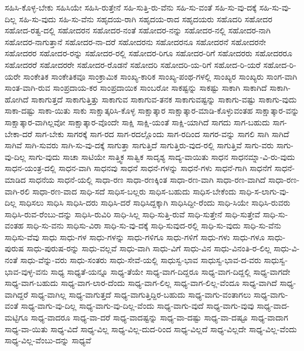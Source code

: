 {ಸಹಿಸಿ-ಕೊಳ್ಳ-ಬೇಕು
ಸಹಿಸಿಯೇ
ಸಹಿಸಿ-ರುತ್ತೇನೆ
ಸಹಿ-ಸುತ್ತಿ-ರು-ವೆನು
ಸಹಿ-ಸು-ವಂತೆ
ಸಹಿ-ಸು-ವು-ದಕ್ಕೆ
ಸಹಿ-ಸು-ವು-ದಿಲ್ಲ
ಸಹಿ-ಸು-ವುದು
ಸಹಿ-ಸು-ವೆನು
ಸಹೃದಯ-ರಾಗಿ
ಸಹೃದಯ-ರಾದ
ಸಹೃದಯರು
ಸಹೊದರಿ
ಸಹೋದರ
ಸಹೋದ-ರತ್ವ-ದಲ್ಲಿ
ಸಹೋದರನ
ಸಹೋದರ-ನಂತೆ
ಸಹೋದರ-ನನ್ನು
ಸಹೋದರ-ನಲ್ಲಿ
ಸಹೋದರ-ನಾಗಿ
ಸಹೋದರ-ನಾಗುತ್ತಾನೆ
ಸಹೋದರ-ನಾ-ದರೆ
ಸಹೋದರನು
ಸಹೋದರನೂ
ಸಹೋದರನೆ
ಸಹೋದರನೇ
ಸಹೋದರರ
ಸಹೋದರ-ರನ್ನು
ಸಹೋದರ-ರಲ್ಲಿ
ಸಹೋದರ-ರಿಗೂ
ಸಹೋದರ-ರಿಗೆ
ಸಹೋದರರು
ಸಹೋದರರೂ
ಸಹೋದರರೆ
ಸಹೋದರರೇ
ಸಹೋದರ-ರೊಡನೆ
ಸಹೋದರಿ
ಸಹೋದರಿ-ಯ-ರಿಗೆ
ಸಹೋದ-ರಿ-ಯರೆ
ಸಹೋದ-ರಿ-ಯರೇ
ಸಾಂಕೇತಿಕ
ಸಾಂಕೇತಿಕವೂ
ಸಾಂಕ್ರಾಮಿಕ
ಸಾಂಖ್ಯ-ಕಾರಿಕ
ಸಾಂಖ್ಯ-ಪಂಥ-ಗಳಲ್ಲಿ
ಸಾಂಖ್ಯರ
ಸಾಂಖ್ಯರು
ಸಾಂಗ-ವಾಗಿ
ಸಾಂತ-ವಾಗಿ-ರುವ
ಸಾಂಪ್ರದಾಯ-ಕರ
ಸಾಂಪ್ರದಾಯಿಕ
ಸಾಂಬರೋ
ಸಾಕಷ್ಟನ್ನು
ಸಾಕಷ್ಟು
ಸಾಕಾಗಿ
ಸಾಕಾಗಿದೆ
ಸಾಕಾಗಿ-ಹೋಗಿದೆ
ಸಾಕಾಗುತ್ತದೆ
ಸಾಕಾಗುತ್ತಿತ್ತು
ಸಾಕಾಗುವ
ಸಾಕಾಗುವ-ತನಕ
ಸಾಕಾಗುವಷ್ಟನ್ನು
ಸಾಕಾಗು-ವಷ್ಟು
ಸಾಕಾಗು-ವುದು
ಸಾಕಾ-ದಷ್ಟು
ಸಾಕಾ-ಯಿತು
ಸಾಕು
ಸಾಕ್ಷಾತ್ಕರಿಸಿ-ಕೊಳ್ಳ
ಸಾಕ್ಷಾತ್ಕಾರ
ಸಾಕ್ಷಾತ್ಕಾರ-ಮಾಡಿ-ಕೊಳ್ಳುವಂತಹ
ಸಾಕ್ಷಾತ್ಕಾರ-ವನ್ನು
ಸಾಕ್ಷಾತ್ಕಾರ-ವಾಗಿಲ್ಲವೋ
ಸಾಕ್ಷಾತ್ಕಾರ-ವೊಂದೇ
ಸಾಕ್ಷಿ
ಸಾಕ್ಷಿ-ಯಂತೆ
ಸಾಕ್ಷಿ-ಯಾಗಿದೆ
ಸಾಗದು
ಸಾಗ-ಬಹುದು
ಸಾಗ-ಬೇಕಾ-ದರೆ
ಸಾಗ-ಬೇಕು
ಸಾಗರಕ್ಕೆ
ಸಾಗ-ರದ
ಸಾಗ-ರದಲ್ಲೊಂದು
ಸಾಗ-ರದಿಂದ
ಸಾಗರ-ವನ್ನು
ಸಾಗಲಿ
ಸಾಗಿ
ಸಾಗಿದೆ
ಸಾಗಿವೆ
ಸಾಗಿ-ಸುವರು
ಸಾಗಿ-ಸು-ವು-ದಕ್ಕೆ
ಸಾಗುತ್ತಾ
ಸಾಗುತ್ತಿದೆ
ಸಾಗುತ್ತಿರು-ವುದ-ರಲ್ಲಿ
ಸಾಗುತ್ತಿವೆ
ಸಾಗು-ವರು
ಸಾಗು-ವು-ದಿಲ್ಲ
ಸಾಗು-ವುದು
ಸಾಚಾ
ಸಾಟಿಯೇ
ಸಾತ್ತ್ವಿಕ
ಸಾತ್ವಿಕ
ಸಾದೃಶ್ಯ
ಸಾದ್ಯ-ವಾಯಿತು
ಸಾಧನ
ಸಾಧನಮ್ನಾ-ವಿ-ರು-ವುದು
ಸಾಧನ-ಯಂತ್ರ-ದಲ್ಲಿ
ಸಾಧನ-ವಾಗಿ
ಸಾಧನವು
ಸಾಧನೆ
ಸಾಧನೆ-ಗಳನ್ನು
ಸಾಧನೆ-ಗಳು
ಸಾಧನೆ-ಗಾಗಿ
ಸಾಧನೆಗೆ
ಸಾಧನೆ-ಮಾಡಿದ
ಸಾಧನೆಯ
ಸಾಧನೆ-ಯಲ್ಲಿ
ಸಾಧಾ-ರಣ
ಸಾಧಾ-ರಣಕ್ಕಿಂತ
ಸಾಧಾ-ರಣ-ವಾಗಿ
ಸಾಧಾ-ರಣ-ವಾಗಿದೆ
ಸಾಧಾ-ರಣ-ವಾಗಿ-ರಲಿ
ಸಾಧಾ-ರಣ-ವಾದ
ಸಾಧಿ-ಸದೆ
ಸಾಧಿಸ-ಬಲ್ಲರು
ಸಾಧಿಸ-ಬಹುದು
ಸಾಧಿಸ-ಬೇಕೆಂದು
ಸಾಧಿ-ಸ-ಲಾಗು-ವು-ದಿಲ್ಲ
ಸಾಧಿಸಲು
ಸಾಧಿಸಿ
ಸಾಧಿಸಿ-ದರು
ಸಾಧಿಸಿ-ದರೆ
ಸಾಧಿಸಿದ್ದಕ್ಕಾಗಿ
ಸಾಧಿಸಿದ್ದೀ-ರೆಂದು
ಸಾಧಿ-ಸಿಯೇ
ಸಾಧಿಸಿ-ರುವರು
ಸಾಧಿಸಿ-ರುವ-ರೆಂಬು-ದನ್ನು
ಸಾಧಿಸಿ-ರುವಿರಿ
ಸಾಧಿ-ಸಿಲ್ಲ
ಸಾಧಿ-ಸುತ್ತಿ-ರುವೆ
ಸಾಧಿ-ಸುತ್ತೇನೆ
ಸಾಧಿ-ಸುತ್ತೇವೆ
ಸಾಧಿ-ಸು-ವಂತಹ
ಸಾಧಿ-ಸು-ವನು
ಸಾಧಿಸು-ವಿರಾ
ಸಾಧಿ-ಸು-ವು-ದಕ್ಕೆ
ಸಾಧಿ-ಸುವುದ-ರಲ್ಲಿ
ಸಾಧಿ-ಸು-ವುದು
ಸಾಧಿ-ಸು-ವೆನು
ಸಾಧಿಸು-ವೆವು
ಸಾಧು
ಸಾಧು-ಗಳ
ಸಾಧು-ಗಳನ್ನು
ಸಾಧು-ಗಳಿಗೂ
ಸಾಧು-ಗಳಿಗೆ
ಸಾಧು-ಗಳು
ಸಾಧು-ಗಳೂ
ಸಾಧು-ಪುರುಷ
ಸಾಧು-ಪುರುಷ-ರನ್ನು
ಸಾಧು-ವಲ್ಲವೆ
ಸಾಧು-ವಾಗಿ
ಸಾಧು-ವಿಗೆ
ಸಾಧು-ವಿನ
ಸಾಧು-ವಿನಂತಿ-ರ-ಲಿಲ್ಲ
ಸಾಧು-ವಿ-ನಂತೆ
ಸಾಧು-ವೆನ್ನು-ವರು
ಸಾಧು-ಸಂತರು
ಸಾಧು-ಸೇವೆ-ಯಲ್ಲಿ
ಸಾಧುಸ್ವ-ಭಾವ
ಸಾಧುಸ್ವ-ಭಾವ-ದ-ವರು
ಸಾಧುಸ್ವ-ಭಾವ-ವುಳ್ಳ-ವನು
ಸಾಧ್ಯ
ಸಾಧ್ಯತೆ-ಯನ್ನೂ
ಸಾಧ್ಯ-ತೆಯೇ
ಸಾಧ್ಯ-ವಾಗ-ದಿದ್ದರೂ
ಸಾಧ್ಯ-ವಾಗ-ದಿದ್ದಲ್ಲಿ
ಸಾಧ್ಯ-ವಾಗದೇ
ಸಾಧ್ಯ-ವಾಗ-ಬಹುದು
ಸಾಧ್ಯ-ವಾಗ-ಲಾರ-ದೆಂದು
ಸಾಧ್ಯ-ವಾಗ-ಲಿಲ್ಲ
ಸಾಧ್ಯ-ವಾಗ-ಲಿಲ್ಲ-ವೆಂದೂ
ಸಾಧ್ಯ-ವಾಗಿದೆ
ಸಾಧ್ಯ-ವಾಗಿದ್ದರೆ
ಸಾಧ್ಯ-ವಾಗಿಲ್ಲ
ಸಾಧ್ಯ-ವಾಗುತ್ತದೆ
ಸಾಧ್ಯ-ವಾಗುತ್ತಿದ್ದಿರ-ಬಹುದು
ಸಾಧ್ಯ-ವಾಗು-ವಂತಾಗಲು
ಸಾಧ್ಯ-ವಾಗು-ವಂತೆ
ಸಾಧ್ಯ-ವಾಗು-ವು-ದಿಲ್ಲ
ಸಾಧ್ಯ-ವಾಗು-ವು-ದಿಲ್ಲ-ವೆಂದು
ಸಾಧ್ಯ-ವಾಗು-ವುದೆ
ಸಾಧ್ಯ-ವಾಗು-ವುವು
ಸಾಧ್ಯ-ವಾದ-ಮಟ್ಟಿಗೂ
ಸಾಧ್ಯ-ವಾದರೂ
ಸಾಧ್ಯ-ವಾ-ದರೆ
ಸಾಧ್ಯ-ವಾದಷ್ಟನ್ನು
ಸಾಧ್ಯ-ವಾ-ದಷ್ಟು
ಸಾಧ್ಯ-ವಾ-ದಷ್ಟೂ
ಸಾಧ್ಯ-ವಾದಾಗ
ಸಾಧ್ಯ-ವಾ-ಯಿತು
ಸಾಧ್ಯ-ವಿದೆ
ಸಾಧ್ಯ-ವಿಲ್ಲ
ಸಾಧ್ಯ-ವಿಲ್ಲ-ದುದ-ರಿಂದ
ಸಾಧ್ಯ-ವಿಲ್ಲದೆ
ಸಾಧ್ಯ-ವಿಲ್ಲದೇ
ಸಾಧ್ಯ-ವಿಲ್ಲ-ವೆಂದು
ಸಾಧ್ಯ-ವಿಲ್ಲ-ವೆಂಬು-ದನ್ನು
ಸಾಧ್ಯವೆ
}
